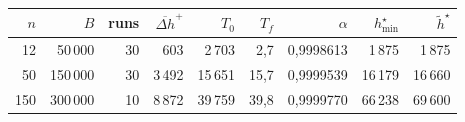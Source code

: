 \begin{tabular}{rrrrrrrrr}
\toprule
$n$ & $B$ & runs & $\overline{\Delta h}^{+}$ & $T_0$ & $T_f$ & $\alpha$ & $h^\star_{\min}$ & $\tilde h^\star$ \\
\midrule
12 & 50\,000 & 30 & 603 & 2\,703 & 2{,}7 & 0{,}9998613 & 1\,875 & 1\,875 \\
50 & 150\,000 & 30 & 3\,492 & 15\,651 & 15{,}7 & 0{,}9999539 & 16\,179 & 16\,660 \\
150 & 300\,000 & 10 & 8\,872 & 39\,759 & 39{,}8 & 0{,}9999770 & 66\,238 & 69\,600 \\
\bottomrule
\end{tabular}
